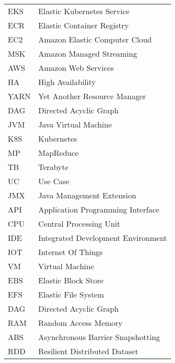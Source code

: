 \begin{longtable}{p{3cm}p{10cm}}
    EKS  & Elastic Kubernetes Service         \\
    ECR  & Elastic Container Registry         \\
    EC2  & Amazon Elastic Computer Cloud      \\
    MSK  & Amazon Managed Streaming           \\
    AWS  & Amazon Web Services                \\
    HA   & High Availability                  \\
    YARN & Yet Another Resource Manager       \\
    DAG  & Directed Acyclic Graph             \\
    JVM  & Java Virtual Machine               \\
    K8S  & Kubernetes                         \\
    MP   & MapReduce                          \\
    TB   & Terabyte                           \\
    UC   & Use Case                           \\
    JMX  & Java Management Extension          \\
    API  & Application Programming Interface  \\
    CPU  & Central Processing Unit            \\
    IDE  & Integrated Development Environment \\
    IOT  & Internet Of Things                 \\
    VM   & Virtual Machine                    \\
    EBS  & Elastic Block Store                \\
    EFS  & Elastic File System                \\
    DAG  & Directed Acyclic Graph             \\
    RAM  & Random Access Memory               \\
    ABS  & Asynchronous Barrier Snapshotting  \\
    RDD  & Resilient Distributed Dataset      \\
\end{longtable}
\addtocounter{table}{-1} 